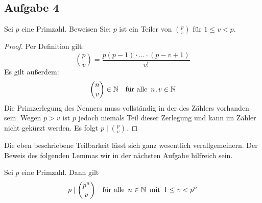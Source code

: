\subsection{Aufgabe 4}
Sei $p$ eine Primzahl. Beweisen Sie: $p$ ist ein Teiler von $\binom{p}{v}$
für $1 \leq v < p$.
\begin{proof}
  Per Definition gilt:
  \begin{equation*}
    \binom{p}{v} = \frac{p(p-1) \cdot \ldots \cdot (p - v + 1)}{v!}
  \end{equation*}
  Es gilt außerdem:
  \begin{equation*}
    \binom{n}{v} \in \mathbb{N} \quad
    \text{für alle} \enspace n,v \in \mathbb{N}
  \end{equation*}
  Die Primzerlegung des Nenners muss
  vollständig in der des Zählers vorhanden sein.
  Wegen $p > v$ ist $p$ jedoch niemals Teil dieser Zerlegung und
  kann im Zähler nicht gekürzt werden.
  Es folgt $p \mid \binom{p}{v}$.
\end{proof}
\noindent
Die eben beschriebene Teilbarkeit lässt sich ganz wesentlich verallgemeinern.
Der Beweis des folgenden Lemmas wir in der nächsten Aufgabe hilfreich sein.
\begin{lemma}
  \label{lemma:p_divides_binom}
  Sei $p$ eine Primzahl. Dann gilt
  \begin{equation*}
    p \mid \binom{p^n}{v} \quad \text{für alle} \enspace n \in \mathbb{N}
    \enspace \text{mit} \enspace 1 \leq v < p^n
  \end{equation*}
\end{lemma}
